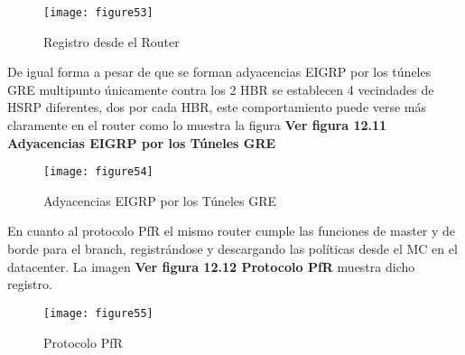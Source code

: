 \begin{figure}[htbp]
  \centering
    {\texttt{[image: figure53]}}%
  \caption{  Registro desde el Router}
  \label{fig:fig2subfig}
\end{figure}

De igual forma a pesar de que se forman adyacencias EIGRP por los túneles GRE multipunto únicamente contra los 2 HBR se establecen 4 vecindades de HSRP diferentes, dos por cada HBR, este comportamiento puede verse más claramente en el router como lo muestra la figura \textbf{Ver figura 12.11 Adyacencias EIGRP por los Túneles GRE}

\begin{figure}[htbp]
  \centering
    {\texttt{[image: figure54]}}%
  \caption{  Adyacencias EIGRP por los Túneles GRE}
  \label{fig:fig2subfig}
\end{figure}

En cuanto al protocolo PfR el mismo router cumple las funciones de master y de borde para el branch, registrándose y descargando las políticas desde el MC en el datacenter. La imagen \textbf{Ver figura 12.12  Protocolo PfR} muestra dicho registro.

\begin{figure}[htbp]
  \centering
    {\texttt{[image: figure55]}}%
  \caption{  Protocolo PfR}
  \label{fig:fig2subfig}
\end{figure}
